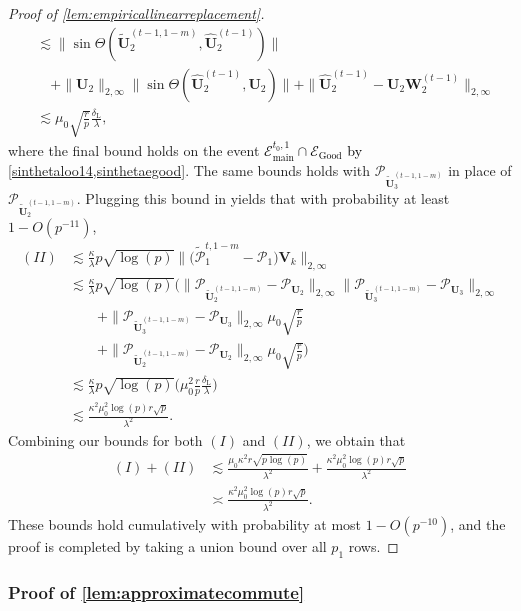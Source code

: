 \documentclass[10pt]{article}
\newcommand{\0}{{\mathbf{0}}}
\newcommand{\1}{{\mathbf{1}}}
\newcommand{\U}{{\mathbf{U}}}
\newcommand{\utilde}{\mathbf{\tilde{U}}}
\newcommand{\uhat}{\mathbf{\hat{U}}}
\newcommand{\dl}{\delta_{\mathrm{L}}}
\renewcommand{\tilde}{\widetilde}
\renewcommand{\hat}{\widehat}
\renewcommand{\hat}{\widehat}
\begin{document}
\begin{proof}[Proof of \cref{lem:empiricallinearreplacement}]
\begin{align*}
    &\lesssim \|\sin\Theta(\utilde_2^{(t-1,1-m)},\uhat_2^{(t-1)} ) \| \\
    &\quad + \| \U_2 \|_{2,\infty} \|\sin\Theta(\uhat_2^{(t-1)},\U_2) \| + \| \uhat_2^{(t-1)} - \U_2 \mathbf{W}_2^{(t-1)} \|_{2,\infty} \\
    &\lesssim \mu_0 \sqrt{\frac{r}{p}} \frac{\dl}{\lambda},
\end{align*}
where the final bound holds on the event \textcolor{black}{$\mathcal{E}_{\mathrm{main}}^{t_0,1} \cap \mathcal{E}_{\mathrm{Good}}$ by \cref{sinthetaloo14,sinthetaegood}}.  
The same bounds holds with $\mathcal{P}_{\utilde_3^{(t-1,1-m)}}$ in place of $\mathcal{P}_{\utilde_2^{(t-1,1-m)}}$.  Plugging this bound in yields that with probability at least $1 - O(p^{-11})$,
\begin{align*}
    (II)  &\lesssim \frac{\kappa}{\lambda} p \sqrt{\log(p)} \bigg\| \bigg( \mathcal{\tilde P}_{1}^{t,1-m} - \mathcal{ P}_1 \bigg) \mathbf{V}_k \bigg\|_{2,\infty} \\
    &\lesssim \frac{\kappa}{\lambda} p \sqrt{\log(p)} \bigg( \| \mathcal{P}_{\utilde_2^{(t-1,1-m)}} - \mathcal{P}_{\U_2} \|_{2,\infty} \| \mathcal{P}_{\utilde_3^{(t-1,1-m)}} - \mathcal{P}_{\U_3} \|_{2,\infty} \\
    &\qquad + \| \mathcal{P}_{\utilde_3^{(t-1,1-m)}} - \mathcal{P}_{\U_3} \|_{2,\infty} \mu_0 \sqrt{\frac{r}{p}} \\
    &\qquad + \| \mathcal{P}_{\utilde_2^{(t-1,1-m)}} - \mathcal{P}_{\U_2} \|_{2,\infty}  \mu_0 \sqrt{\frac{r}{p}} \bigg) \\
    &\lesssim \frac{\kappa}{\lambda} p \sqrt{\log(p)} \bigg( \mu_0^2 \frac{r}{p} \frac{\dl}{\lambda} \bigg) \\
    &\lesssim \frac{\kappa^2 \mu_0^2 \log(p) r \sqrt{p}}{\lambda^2}.
\end{align*}
Combining our bounds for both $(I)$ and $(II)$, we obtain that
\begin{align*}
    (I) + (II) &\lesssim \frac{\mu_0 \kappa^2 r \sqrt{p\log(p)}}{\lambda^2} + \frac{\kappa^2 \mu_0^2 \log(p) r \sqrt{p}}{\lambda^2} \\
    &\asymp \frac{\kappa^2 \mu_0^2 \log(p) r \sqrt{p}}{\lambda^2}.
\end{align*}
These bounds hold cumulatively with probability at most $1 - O(p^{-10})$, and the proof is completed by taking a union bound over all $p_1$ rows.
\end{proof}

\subsubsection{Proof of \cref{lem:approximatecommute}}
\end{document}
